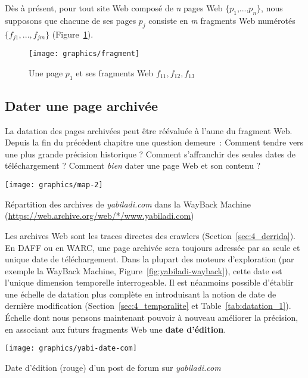 \documentclass[symmetric,justified,marginals=raggedouter]{tufte-book}
\begin{document}
Dès à présent, pour tout site Web composé de \textit{n} pages Web $\{p_1$,...,$p_n\}$, nous supposons que chacune de ses pages $p_j$ consiste en \textit{m} fragments Web numérotés $\{f_{j1},...,f_{jm}\}$ (Figure~\ref{fig:fragment}).

\begin{figure}%
  \texttt{[image: graphics/fragment]}
  \caption{Une page $p_1$ et ses fragments Web $f_{11}, f_{12}, f_{13}$}
  \label{fig:fragment}
\end{figure}

\subsection{Dater une page archivée}

\noindent La datation des pages archivées peut être réévaluée à l'aune du fragment Web. Depuis la fin du précédent chapitre une question demeure~: Comment tendre vers une plus grande précision historique ? Comment s'affranchir des seules dates de téléchargement ? Comment \textit{bien} dater une page Web et son contenu ?

\begin{marginfigure}%
  \texttt{[image: graphics/map-2]}
  \caption{Répartition des archives de \textit{yabiladi.com} dans la WayBack Machine (\url{https://web.archive.org/web/*/www.yabiladi.com})}
  \label{fig:yabiladi-wayback}
\end{marginfigure}

Les archives Web sont les traces directes des crawlers (Section~\ref{sec:4_derrida}). En DAFF ou en WARC, une page archivée sera toujours adressée par sa seule et unique date de téléchargement. Dans la plupart des moteurs d'exploration (par exemple la WayBack Machine, Figure~\ref{fig:yabiladi-wayback}), cette date est l'unique dimension temporelle interrogeable. Il est néanmoins possible d'établir une échelle de datation plus complète en introduisant la notion de date de dernière modification (Section~\ref{sec:4_temporalite} et Table~\ref{tab:datation_1}). Échelle dont nous pensons maintenant pouvoir à nouveau améliorer la précision, en associant aux futurs fragments Web une \textbf{date d'édition}. 

\begin{marginfigure}%
  \texttt{[image: graphics/yabi-date-com]}
  \caption{Date d'édition (rouge) d'un post de forum sur \textit{yabiladi.com}}
  \label{fig:yabi-date-com}
\end{marginfigure}  
\end{document}
